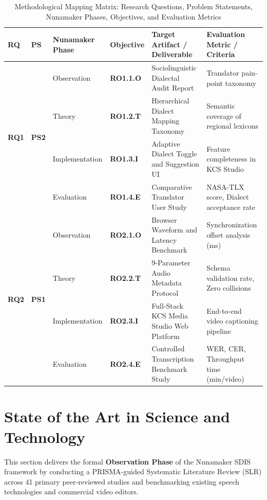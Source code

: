 \documentclass[conference]{IEEEtran}
\begin{document}
\begin{table}[t]
\centering
\small
\caption{Methodological Mapping Matrix: Research Questions, Problem Statements, Nunamaker Phases, Objectives, and Evaluation Metrics}
\label{tab:methodology_mapping}
\begin{tabular}{p{1.0cm} p{1.0cm} p{2.6cm} p{1.6cm} p{5.3cm} p{4.0cm}}
\toprule
\textbf{RQ} & \textbf{PS} & \textbf{Nunamaker Phase} & \textbf{Objective} & \textbf{Target Artifact / Deliverable} & \textbf{Evaluation Metric / Criteria} \\
\midrule
\multirow{4}{*}{\textbf{RQ1}} & \multirow{4}{*}{\textbf{PS2}} & Observation & \textbf{RO1.1.O} & Sociolinguistic Dialectal Audit Report & Translator pain-point taxonomy \\
\addlinespace
& & Theory & \textbf{RO1.2.T} & Hierarchical Dialect Mapping Taxonomy & Semantic coverage of regional lexicons \\
\addlinespace
& & Implementation & \textbf{RO1.3.I} & Adaptive Dialect Toggle and Suggestion UI & Feature completeness in KCS Studio \\
\addlinespace
& & Evaluation & \textbf{RO1.4.E} & Comparative Translator User Study & NASA-TLX score, Dialect acceptance rate \\
\midrule
\multirow{4}{*}{\textbf{RQ2}} & \multirow{4}{*}{\textbf{PS1}} & Observation & \textbf{RO2.1.O} & Browser Waveform and Latency Benchmark & Synchronization offset analysis (ms) \\
\addlinespace
& & Theory & \textbf{RO2.2.T} & 9-Parameter Audio Metadata Protocol & Schema validation rate, Zero collisions \\
\addlinespace
& & Implementation & \textbf{RO2.3.I} & Full-Stack KCS Media Studio Web Platform & End-to-end video captioning pipeline \\
\addlinespace
& & Evaluation & \textbf{RO2.4.E} & Controlled Transcription Benchmark Study & WER, CER, Throughput time (min/video) \\
\bottomrule
\end{tabular}
\end{table}

\section{State of the Art in Science and Technology}
\label{sec:sota}

This section delivers the formal \textbf{Observation Phase} of the Nunamaker SDIS framework by conducting a PRISMA-guided Systematic Literature Review (SLR) across 41 primary peer-reviewed studies and benchmarking existing speech technologies and commercial video editors.
\end{document}
